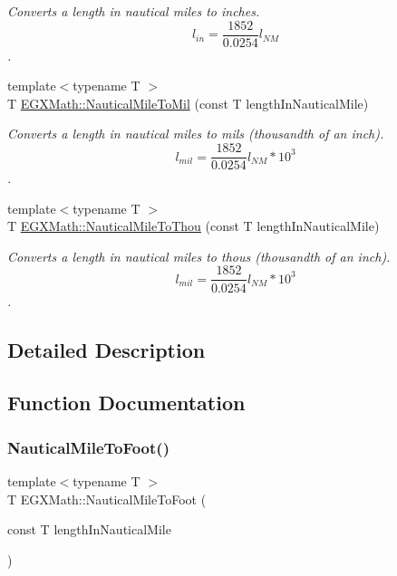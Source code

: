 \begin{DoxyCompactItemize}
\begin{DoxyCompactList}\small\item\em Converts a length in nautical miles to inches. \[ l_{in}= \frac{1852}{0.0254} l_{NM} \]. \end{DoxyCompactList}\item 
{\footnotesize template$<$typename T $>$ }\\T \mbox{\hyperlink{group___e_g_x_math-_conversions-_length_conversions-_non-_s_i-_nautical_mile-_imperial_ga30322f1dff254ba1eff05b0d10617fe7}{E\+G\+X\+Math\+::\+Nautical\+Mile\+To\+Mil}} (const T length\+In\+Nautical\+Mile)
\begin{DoxyCompactList}\small\item\em Converts a length in nautical miles to mils (thousandth of an inch). \[ l_{mil}= \frac{1852}{0.0254} l_{NM} * 10^{3} \]. \end{DoxyCompactList}\item 
{\footnotesize template$<$typename T $>$ }\\T \mbox{\hyperlink{group___e_g_x_math-_conversions-_length_conversions-_non-_s_i-_nautical_mile-_imperial_ga2791d7d115ca8640a88ce3180db9dddb}{E\+G\+X\+Math\+::\+Nautical\+Mile\+To\+Thou}} (const T length\+In\+Nautical\+Mile)
\begin{DoxyCompactList}\small\item\em Converts a length in nautical miles to thous (thousandth of an inch). \[ l_{mil}= \frac{1852}{0.0254} l_{NM} * 10^{3} \]. \end{DoxyCompactList}\end{DoxyCompactItemize}


\subsection{Detailed Description}


\subsection{Function Documentation}
\mbox{\label{group___e_g_x_math-_conversions-_length_conversions-_non-_s_i-_nautical_mile-_imperial_ga5c74e872b454cc243bb0d77f0d8f76a1}} 
\subsubsection{\texorpdfstring{Nautical\+Mile\+To\+Foot()}{NauticalMileToFoot()}}
{\footnotesize\ttfamily template$<$typename T $>$ \\
T E\+G\+X\+Math\+::\+Nautical\+Mile\+To\+Foot (\begin{DoxyParamCaption}\item[{const T}]{length\+In\+Nautical\+Mile }\end{DoxyParamCaption})}



